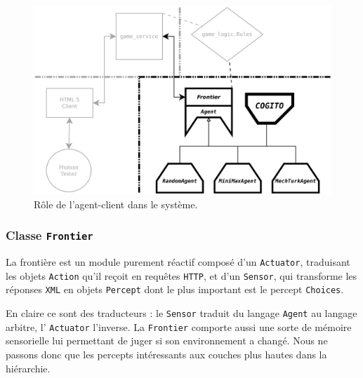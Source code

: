 \begin{figure}[H] 
\centering
\includegraphics[width=\textwidth]{files/william/archi_client_machine} 
\caption{Rôle de l'agent-client dans le système.} 
\end{figure}

\subsubsection{Classe \texttt{Frontier}}
La frontière est un module purement réactif composé d'un \texttt{Actuator}, traduisant les objets \texttt{Action} qu'il reçoit en requêtes \texttt{HTTP}, et d'un \texttt{Sensor}, qui transforme les réponses \texttt{XML} en objets \texttt{Percept} dont le plus important est le percept \texttt{Choices}.

En claire ce sont des traducteurs : le \texttt{Sensor} traduit du langage \texttt{Agent} au langage arbitre, l' \texttt{Actuator} l'inverse. La \texttt{Frontier} comporte aussi une sorte de mémoire sensorielle lui permettant de juger si son environnement a changé. Nous ne passons donc que les percepts intéressants aux couches plus hautes dans la hiérarchie.  

